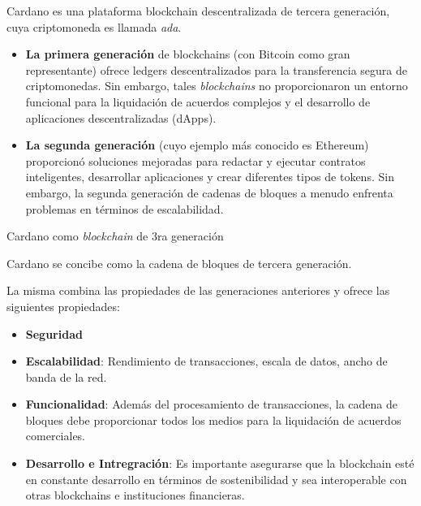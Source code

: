 \documentclass{beamer}
\begin{document}
\begin{frame}
Cardano es una plataforma blockchain descentralizada de tercera generación, cuya criptomoneda es llamada \textit{ada}. 

\pause

\begin{itemize}
    \item \textbf{La primera generación} de blockchains (con Bitcoin como gran representante) ofrece ledgers descentralizados para la transferencia segura de criptomonedas. \pause Sin embargo, tales \textit{blockchains} no proporcionaron un entorno funcional para la liquidación de acuerdos complejos y el desarrollo de aplicaciones descentralizadas (dApps). 
    \pause

    \item \textbf{La segunda generación} (cuyo ejemplo más conocido es Ethereum) proporcionó soluciones mejoradas para redactar y ejecutar contratos inteligentes, desarrollar aplicaciones y crear diferentes tipos de tokens. \pause Sin embargo, la segunda generación de cadenas de bloques a menudo enfrenta problemas en términos de escalabilidad.
\end{itemize}
\end{frame}

\begin{frame}{Cardano como \textit{blockchain} de 3ra generación}

Cardano se concibe como la cadena de bloques de tercera generación.

La misma combina las propiedades de las generaciones anteriores y ofrece las siguientes propiedades:
\pause

\begin{itemize}
    \item \textbf{Seguridad}
        \pause
    \item \textbf{Escalabilidad}: Rendimiento de transacciones, escala de datos, ancho de banda de la red.
        \pause
    \item \textbf{Funcionalidad}: Además del procesamiento de transacciones, la cadena de bloques debe proporcionar todos los medios para la liquidación de acuerdos comerciales. 
        \pause
    \item \textbf{Desarrollo e Intregración}: Es importante asegurarse que la blockchain esté en constante desarrollo en términos de sostenibilidad y sea interoperable con otras blockchains e instituciones financieras.
\end{itemize} 

\end{frame}
\end{document}

